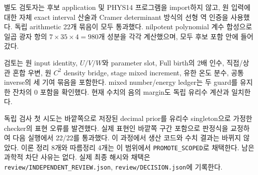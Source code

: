 별도 검토자는 후보 application 및 PHYS14 프로그램을 import하지 않고,
원 입력에 대한 자체 exact interval 산술과 Cramer determinant 방식의
선형 역 인증을 사용했다. 독립 arithmetic 22개 묶음이 모두 통과했다.
nilpotent polynomial 계수 합성으로 일곱 광자 항의
$7\times35\times4=980$개 성분을 각각 계산했으며,
모두 후보 포함 안에 들어갔다.

검토는 원 input identity, $U/V/W$와 parameter slot, Full birth의 2배
인수, 직접/상관 혼합 우변, 원 $C^2$ density bridge, stage mixed
increment, 유한 온도 분수, 공통 inverse의 세 기여 묶음을 포함한다.
mixed number/energy ledger는 두 guard를 유지한 잔차의 0 포함을
확인했다. 현재 수치의 음의 margin도 독립 유리수 계산과 일치한다.

독립 검사 첫 시도는 바깥쪽으로 저장된 decimal prior를 유리수
singleton으로 가정한 checker의 표현 오류를 발견했다. 실제 표현인
바깥쪽 구간 포함으로 판정식을 교정하여 다음 실행에서 22/22를
통과했다. 이 과정에서 생산 코드와 수치 결과는 바뀌지 않았다.
이론 정리 8개와 따름정리 4개는 이 범위에서 \texttt{PROMOTE\_SCOPED}로
채택한다. 남은 과학적 차단 사유는 없다. 실제 최종 해시와 채택은
\nolinkurl{review/INDEPENDENT_REVIEW.json},
\nolinkurl{review/DECISION.json}에 기록한다.
